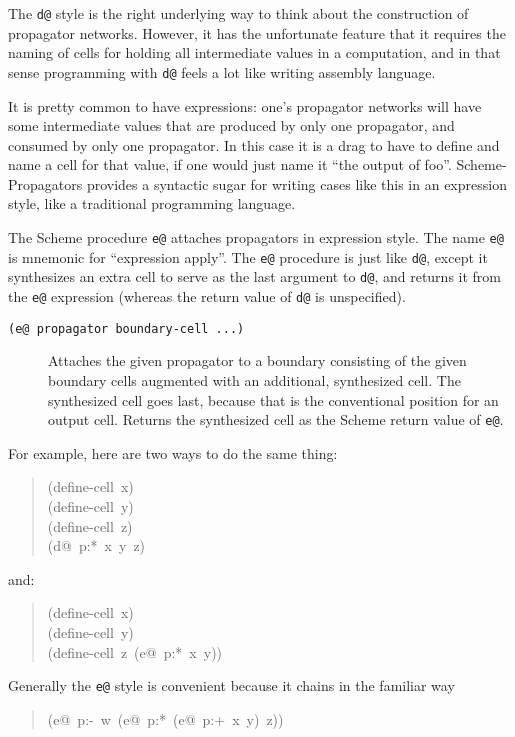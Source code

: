 \documentclass[12pt,letterpaper,english]{article}
\begin{document}
The \texttt{d@} style is the right underlying way to think about the
construction of propagator networks.  However, it has the unfortunate
feature that it requires the naming of cells for holding all
intermediate values in a computation, and in that sense programming
with \texttt{d@} feels a lot like writing assembly language.

It is pretty common to have expressions: one's propagator networks
will have some intermediate values that are produced by only one
propagator, and consumed by only one propagator.  In this case it is a
drag to have to define and name a cell for that value, if one would
just name it ``the output of foo''.  Scheme-Propagators provides a
syntactic sugar for writing cases like this in an expression style, like a
traditional programming language.

The Scheme procedure \texttt{e@} attaches propagators in expression style.
The name \texttt{e@} is mnemonic for ``expression apply''.  The \texttt{e@}
procedure is just like \texttt{d@}, except it synthesizes an extra cell to
serve as the last argument to \texttt{d@}, and returns it from the \texttt{e@}
expression (whereas the return value of \texttt{d@} is unspecified).
\begin{description}
\item[{\texttt{(e@ propagator boundary-cell ...)}}] \leavevmode 
Attaches the given propagator to a boundary consisting of the given
boundary cells augmented with an additional, synthesized cell.  The
synthesized cell goes last, because that is the conventional
position for an output cell.  Returns the synthesized cell as the
Scheme return value of \texttt{e@}.

\end{description}

For example, here are two ways to do the same thing:
\begin{quote}{\ttfamily \raggedright \noindent
(define-cell~x)~\\
(define-cell~y)~\\
(define-cell~z)~\\
(d@~p:*~x~y~z)
}\end{quote}
and:
\begin{quote}{\ttfamily \raggedright \noindent
(define-cell~x)~\\
(define-cell~y)~\\
(define-cell~z~(e@~p:*~x~y))
}\end{quote}

Generally the \texttt{e@} style is convenient because it chains in
the familiar way
\begin{quote}{\ttfamily \raggedright \noindent
(e@~p:-~w~(e@~p:*~(e@~p:+~x~y)~z))
}\end{quote}
\end{document}
